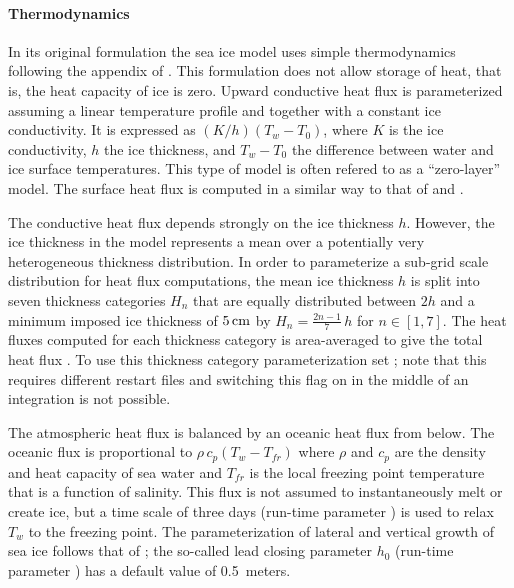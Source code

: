 \paragraph{Thermodynamics\label{sec:pkg:seaice:thermodynamics}}

In its original formulation the sea ice model \citep{menemenlis05}
uses simple thermodynamics following the appendix of
\citet{sem76}. This formulation does not allow storage of heat,
that is, the heat capacity of ice is zero. Upward conductive heat flux
is parameterized assuming a linear temperature profile and together
with a constant ice conductivity. It is expressed as
$(K/h)(T_{w}-T_{0})$, where $K$ is the ice conductivity, $h$ the ice
thickness, and $T_{w}-T_{0}$ the difference between water and ice
surface temperatures. This type of model is often refered to as a
``zero-layer'' model. The surface heat flux is computed in a similar
way to that of \citet{parkinson79} and \citet{manabe79}. 

The conductive heat flux depends strongly on the ice thickness $h$.
However, the ice thickness in the model represents a mean over a
potentially very heterogeneous thickness distribution.  In order to
parameterize a sub-grid scale distribution for heat flux
computations, the mean ice thickness $h$ is split into seven thickness
categories $H_{n}$ that are equally distributed between $2h$ and a
minimum imposed ice thickness of $5\text{\,cm}$ by $H_n=
\frac{2n-1}{7}\,h$ for $n\in[1,7]$. The heat fluxes computed for each
thickness category is area-averaged to give the total heat flux
\citep{hibler84}. To use this thickness category parameterization set
; note that this requires
different restart files and switching this flag on in the middle of an
integration is not possible.

The atmospheric heat flux is balanced by an oceanic heat flux from
below.  The oceanic flux is proportional to
$\rho\,c_{p}\left(T_{w}-T_{fr}\right)$ where $\rho$ and $c_{p}$ are
the density and heat capacity of sea water and $T_{fr}$ is the local
freezing point temperature that is a function of salinity. This flux
is not assumed to instantaneously melt or create ice, but a time scale
of three days (run-time parameter ) is used
to relax $T_{w}$ to the freezing point.
%
The parameterization of lateral and vertical growth of sea ice follows
that of \citet{hib79, hib80}; the so-called lead closing parameter
$h_{0}$ (run-time parameter ) has a default value of
0.5~meters.

